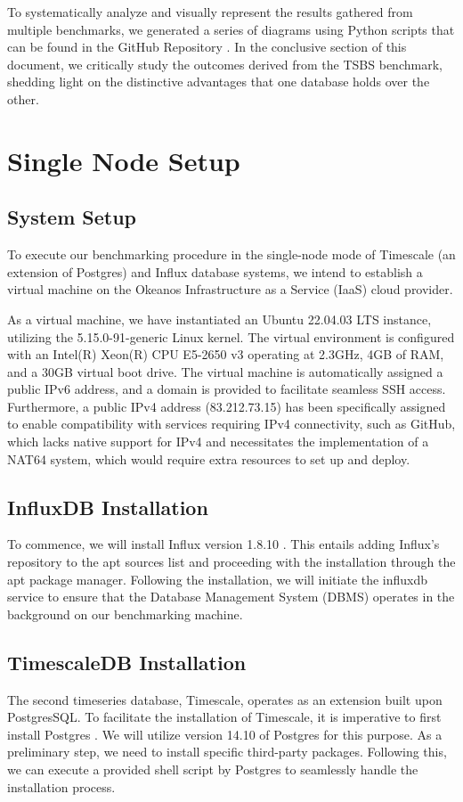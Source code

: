 \documentclass[conference]{IEEEtran}
\begin{document}
To systematically analyze and visually represent the results gathered from multiple benchmarks, we generated a series of diagrams using Python scripts that can be found in the GitHub Repository \cite{b2}. In the conclusive section of this document, we critically study the outcomes derived from the TSBS benchmark, shedding light on the distinctive advantages that one database holds over the other.

\section{Single Node Setup}

\subsection{System Setup}

To execute our benchmarking procedure in the single-node mode of Timescale (an extension of Postgres) and Influx database systems, we intend to establish a virtual machine on the Okeanos Infrastructure as a Service (IaaS) cloud provider. 

As a virtual machine, we have instantiated an Ubuntu 22.04.03 LTS instance, utilizing the 5.15.0-91-generic Linux kernel. The virtual environment is configured with an Intel(R) Xeon(R) CPU E5-2650 v3 operating at 2.3GHz, 4GB of RAM, and a 30GB virtual boot drive. The virtual machine is automatically assigned a public IPv6 address, and a domain is provided to facilitate seamless SSH access. Furthermore, a public IPv4 address (83.212.73.15) has been specifically assigned to enable compatibility with services requiring IPv4 connectivity, such as GitHub, which lacks native support for IPv4 and necessitates the implementation of a NAT64 system, which would require extra resources to set up and deploy.

\subsection{InfluxDB Installation}
To commence, we will install Influx version 1.8.10 \cite{b3}. This entails adding Influx's repository to the apt sources list and proceeding with the installation through the apt package manager. Following the installation, we will initiate the influxdb service to ensure that the Database Management System (DBMS) operates in the background on our benchmarking machine.

\subsection{TimescaleDB Installation}
The second timeseries database, Timescale, operates as an extension built upon PostgresSQL. To facilitate the installation of Timescale, it is imperative to first install Postgres \cite{b4}. We will utilize version 14.10 of Postgres for this purpose. As a preliminary step, we need to install specific third-party packages. Following this, we can execute a provided shell script by Postgres to seamlessly handle the installation process.
\end{document}
